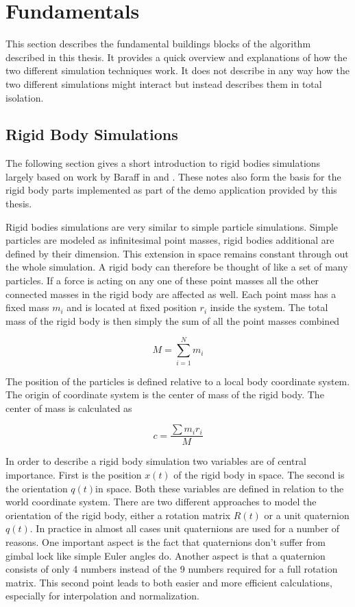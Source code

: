 \chapter{Fundamentals}
\label{cha:fundamentals}

This section describes the fundamental buildings blocks of the algorithm described in this thesis. It provides a quick overview and explanations of how the two different simulation techniques work. It does not describe in any way how the two different simulations might interact but instead describes them in total isolation.

\section{Rigid Body Simulations}
\label{sec:rigid_body_simulations}

The following section gives a short introduction to rigid bodies simulations largely based on work by Baraff in \cite{Baraff:1997uh} and \cite{Baraff:1997wq}. These notes also form the basis for the rigid body parts implemented as part of the demo application provided by this thesis.

Rigid bodies simulations are very similar to simple particle simulations. Simple particles are modeled as infinitesimal point masses, rigid bodies additional are defined by their dimension. This extension in space remains constant through out the whole simulation. A rigid body can therefore be thought of like a set of many particles. If a force is acting on any one of these point masses all the other connected masses in the rigid body are affected as well. Each point mass has a fixed mass $m_i$ and is located at fixed position $r_i$ inside the system. The total mass of the rigid body is then simply the sum of all the point masses combined

\begin{equation}
M = \sum\limits_{i=1}^N m_i
\end{equation}

The position of the particles is defined relative to a local body coordinate system. The origin of coordinate system is the center of mass of the rigid body. The center of mass is calculated as 

\begin{equation}
c = \frac{\sum m_i r_i}{M}
\end{equation}

In order to describe a rigid body simulation two variables are of central importance. First is the position \(x(t)\) of the rigid body in space. The second is the orientation \(q(t)\)in space. Both these variables are defined in relation to the world coordinate system. There are two different approaches to model the orientation of the rigid body, either a rotation matrix $R(t)$ or a unit quaternion $q(t)$. In practice in almost all cases unit quaternions are used for a number of reasons. One important aspect is the fact that quaternions don't suffer from gimbal lock like simple Euler angles do. Another aspect is that a quaternion consists of only 4 numbers instead of the 9 numbers required for a full rotation matrix. This second point leads to both easier and more efficient calculations, especially for interpolation and normalization.

